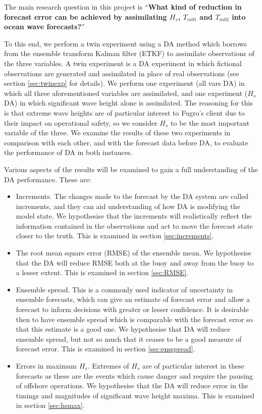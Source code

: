 The main research question in this project is ``\textbf{What kind of reduction in forecast error can be achieved by assimilating $H_s$, $T_{m01}$ and $T_{m02}$ into ocean wave forecasts?}''

To this end, we perform a twin experiment using a DA method which borrows from the ensemble transform Kalman filter (ETKF) to assimilate observations of the three variables. A twin experiment is a DA experiment in which fictional observations are generated and assimilated in place of real observations (see section \ref{sec:twinexp} for details). We perform one experiment (all vars DA) in which all three aforementioned variables are assimilated, and one experiment ($H_s$ DA) in which significant wave height alone is assimilated. The reasoning for this is that extreme wave heights are of particular interest to Fugro's client due to their impact on operational safety, so we consider $H_s$ to be the most important variable of the three. We examine the results of these two experiments in comparison with each other, and with the forecast data before DA, to evaluate the performance of DA in both instances.

Various aspects of the results will be examined to gain a full understanding of the DA performance. These are:

\begin{itemize}
\item Increments. The changes made to the forecast by the DA system are called increments, and they can aid understanding of how DA is modifying the model state. We hypothesise that the increments will realistically reflect the information contained in the observations and act to move the forecast state closer to the truth. This is examined in section \ref{sec:increments}.
\item The root mean square error (RMSE) of the ensemble mean. We hypothesise that the DA will reduce RMSE both at the buoy and away from the buoy to a lesser extent. This is examined in section \ref{sec:RMSE}.
\item Ensemble spread. This is a commonly used indicator of uncertainty in ensemble forecasts, which can give an estimate of forecast error and allow a forecast to inform decisions with greater or lesser confidence. It is desirable then to have ensemble spread which is comparable with the forecast error so that this estimate is a good one. We hypothesise that DA will reduce ensemble spread, but not so much that it ceases to be a good measure of forecast error. This is examined in section \ref{sec:ensspread}.
\item Errors in maximum $H_s$. Extremes of $H_s$ are of particular interest in these forecasts as these are the events which cause danger and require the pausing of offshore operations. We hypothesise that the DA will reduce error in the timings and magnitudes of significant wave height maxima. This is examined in section \ref{sec:hsmax}.
\end{itemize}

